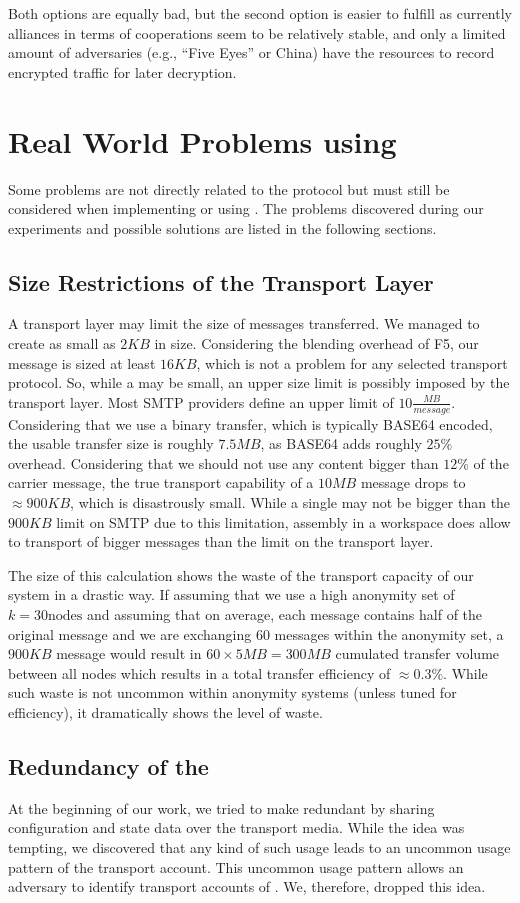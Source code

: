Both options are equally bad, but the second option is easier to fulfill as currently alliances in terms of cooperations seem to be relatively stable, and only a limited amount of adversaries (e.g., ``Five Eyes'' or China) have the resources to record encrypted traffic for later decryption.

\chapter{Real World Problems using \MessageVortex}
Some problems are not directly related to the \MessageVortex{} protocol but must still be considered when implementing or using \MessageVortex. The problems discovered during our experiments and possible solutions are listed in the following sections.

\section{Size Restrictions of the Transport Layer}
A transport layer may limit the size of messages transferred. We managed to create \VortexMessages{} as small as $2KB$ in size. Considering the blending overhead of F5, our message is sized at least $16KB$, which is not a problem for any selected transport protocol. So, while a \VortexMessage{} may be small, an upper size limit is possibly imposed by the transport layer. Most SMTP providers define an upper limit of $10\frac{MB}{message}$. Considering that we use a binary transfer, which is typically BASE64 encoded, the usable transfer size is roughly $7.5MB$, as BASE64 adds roughly $25\%$ overhead. Considering that we should not use any content bigger than $12\%$ of the carrier message, the true transport capability of a $10MB$ message drops to $\approx 900KB$, which is disastrously small. While a single \VortexMessage{} may not be bigger than the $900KB$ limit on SMTP due to this limitation, assembly in a workspace does allow to transport of bigger messages than the limit on the transport layer.

The size of this calculation shows the waste of the transport capacity of our system in a drastic way. If assuming that we use a high anonymity set of $k=30 \text{nodes}$ and assuming that on average, each message contains half of the original message and we are exchanging 60 messages within the anonymity set, a $900KB$ message would result in $60\times 5MB=300MB$ cumulated transfer volume between all nodes which results in a total transfer efficiency of $\approx 0.3\%$. While such waste is not uncommon within anonymity systems (unless tuned for efficiency), it dramatically shows the level of waste.

\section{Redundancy of the \VortexNode}
At the beginning of our work, we tried to make \VortexNodes{} redundant by sharing configuration and state data over the transport media. While the idea was tempting, we discovered that any kind of such usage leads to an uncommon usage pattern of the transport account. This uncommon usage pattern allows an adversary to identify transport accounts of \VortexNodes. We, therefore, dropped this idea. 